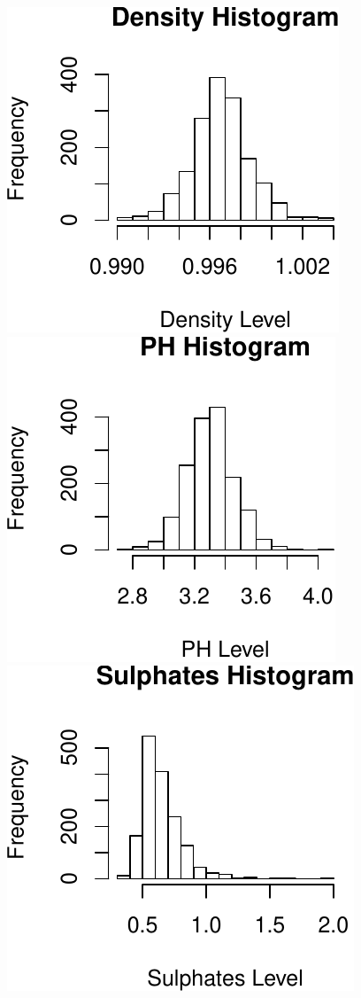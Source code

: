 \documentclass[]{article}
\begin{document}
\includegraphics{./Project_files/figure-latex/unnamed-chunk-18-7.pdf}
\includegraphics{./Project_files/figure-latex/unnamed-chunk-18-8.pdf}
\includegraphics{./Project_files/figure-latex/unnamed-chunk-18-9.pdf}
\end{document}
